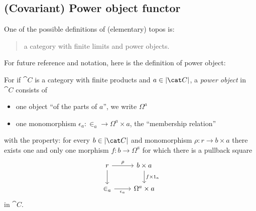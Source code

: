 
\subsection{(Covariant) Power object functor}

One of the possible definitions of (elementary) topos is:
\begin{quotation}
a category with finite limits and power objects. 
\end{quotation}
For future reference and notation, here is the definition of power object:
\begin{definition}
For if \(\cat C\) is a category with finite products and \(a \in \abs{\cat C}\), a {\em power object} in \(\cat C\) consists of
\begin{itemize}
\item one object \enquote{of the parts of \(a\)}, we write \(\Omega^a\)
\item one monomorphism \(\epsilon_a : \in_a \to \Omega^a \times a\), the \enquote{membership relation}
\end{itemize}
with the property: for every \(b \in \abs{\cat C}\) and monomorphism \(\rho : r \to b \times a\) there exists one and only one morphism \(f : b \to \Omega^a\) for which there is a pullback square
\[\begin{tikzcd}
r \ar["\rho", r] \ar[d] & b \times a  \ar["{f \times \id_a}", d]\\
\in_a \ar["{\epsilon_a}", r, swap]    & \Omega^a \times a
\end{tikzcd}\]
in \(\cat C\).
\end{definition}

